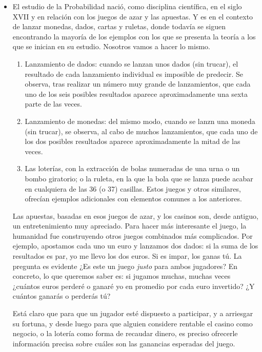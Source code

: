 \begin{itemize}

    \item El estudio de la Probabilidad nació, como disciplina científica, en el siglo XVII y en relación con los juegos de azar y las apuestas. Y es en el contexto de lanzar monedas, dados, cartas y ruletas, donde todavía se siguen encontrando la mayoría de los ejemplos con los que se presenta la teoría a los que se inician en su estudio. Nosotros vamos a hacer lo mismo.
        \begin{enumerate}
            \item Lanzamiento de dados: cuando se lanzan unos dados (sin trucar), el resultado de cada lanzamiento individual es imposible de predecir. Se observa, tras realizar un número muy grande de lanzamientos, que cada uno de los seis posibles resultados aparece aproximadamente una sexta parte de las veces.
            \item Lanzamiento de monedas: del mismo modo, cuando se lanzn una moneda (sin trucar), se observa, al cabo de muchos lanzamientos, que cada uno de los dos posibles resultados aparece aproximadamente la mitad de las veces.
            \item Las loterías, con la extracción de bolas numeradas de una urna o un bombo giratorio; o la ruleta, en la que la bola que se lanza puede acabar en cualquiera de las 36 (o 37) casillas.  Estos juegos y otros similares, ofrecían ejemplos adicionales con elementos comunes a los anteriores.
        \end{enumerate}
        Las apuestas, basadas en esos juegos de azar, y los casinos son, desde antiguo, un entretenimiento muy apreciado. Para hacer más interesante el juego, la humanidad fue construyendo otros juegos combinados más complicados. Por ejemplo, apostamos cada uno un euro y lanzamos dos dados: si la suma de los resultados es par, yo me llevo los dos euros. Si es impar, los ganas tú. La pregunta es evidente ¿Es este un juego {\em justo} para ambos jugadores? En concreto, lo que queremos saber es: si jugamos muchas, muchas veces ¿cuántos euros perderé o ganaré yo en promedio por cada euro invertido? ¿Y cuántos ganarás o perderás tú?

        Está claro que para que un jugador esté dispuesto a participar, y a arriesgar su fortuna, y desde luego para que alguien considere rentable el casino como negocio, o la lotería como forma de recaudar dinero, es preciso ofrecerle {\sf información precisa sobre cuáles son las ganancias esperadas del juego}.


\end{itemize}
